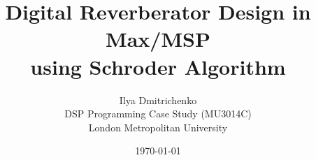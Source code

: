 \documentclass[12pt]{article}
\title{Digital Reverberator Design in Max/MSP\\using Schroder Algorithm}
\author{Ilya Dmitrichenko
\\\small DSP Programming Case Study (MU3014C)
\\\small London Metropolitan University}
\date{\today}
\begin{document}
\maketitle

\cite{farnell2010designing, moorer1979about, puckette2007theory,
gardner1992virtual, gardner1998algorithms}





\end{document}
